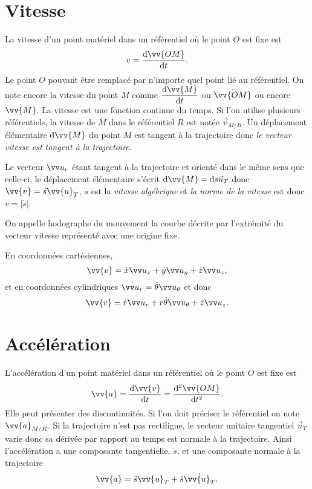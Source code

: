 \section{Vitesse}\label{chap1-sec:vitesse}

La vitesse d'un point matériel dans un référentiel où le point \(O\) est fixe est
\begin{equation}
  v = \derived{\vv{OM}}{t}.
\end{equation}
Le point \(O\) pouvant être remplacé par n'importe quel point lié au référentiel. On note encore la vitesse du point \(M\) comme \(\derived{\vv{M}}{t}\) ou \(\dot{\vv{OM}}\) ou encore \(\dot{\vv{M}}\). La vitesse est une fonction continue du temps. Si l'on utilise plusieurs référentiels, la vitesse de \(M\) dans le référentiel \(R\) est notée \(\vec{v}_{M/R}\). Un déplacement élémentaire \(\D \vv{M}\) du point \(M\) est tangent à la trajectoire donc \emph{le vecteur vitesse est tangent à la trajectoire}.

Le vecteur \(\ur\) étant tangent à la trajectoire et orienté dans le même sens que celle-ci, le déplacement élémentaire s'écrit \(\D \vv{M}=\D s \vec{u}_T\) donc \(\vv{v}=\dot{s} \vv{u}_T\), \(\dot{s}\) est la \emph{vitesse algébrique} et \emph{la norme de la vitesse} est donc \(v=|\dot{s}|\).

On appelle hodographe du mouvement la courbe décrite par l'extrémité du vecteur vitesse représenté avec une origine fixe.

En coordonnées cartésiennes,
\begin{equation}
  \vv{v} = \dot{x}\ux+\dot{y}\uy+\dot{z}\uz,
\end{equation}
et en coordonnées cylindriques \(\dot{\ur}=\dot{\theta}\utheta\) et donc
\begin{equation}
  \vv{v}=\dot{r}\ur+r\dot{\theta}\utheta+\dot{z}\uz.
\end{equation}

\section{Accélération}\label{chap1-sec:accélération}

L'accélération d'un point matériel dans un référentiel où le point \(O\) est fixe est
\begin{equation}
  \vv{a}=\derived{\vv{v}}{t}=\deriveds{\vv{OM}}{t}.
\end{equation}
Elle peut présenter des discontinuités. Si l'on doit préciser le référentiel on note \(\vv{a}_{M/R}\). Si la trajectoire n'est pas rectiligne, le vecteur unitaire tangentiel \(\vec{u}_T\) varie donc sa dérivée par rapport au temps est normale à la trajectoire. Ainsi l'accélération a une composante tangentielle, \(\ddot{s}\), et une composante normale à la trajectoire
\begin{equation}
  \vv{a}=\ddot{s}\vv{u}_T + \dot{s}\dot{\vv{u}_T}.
\end{equation}

